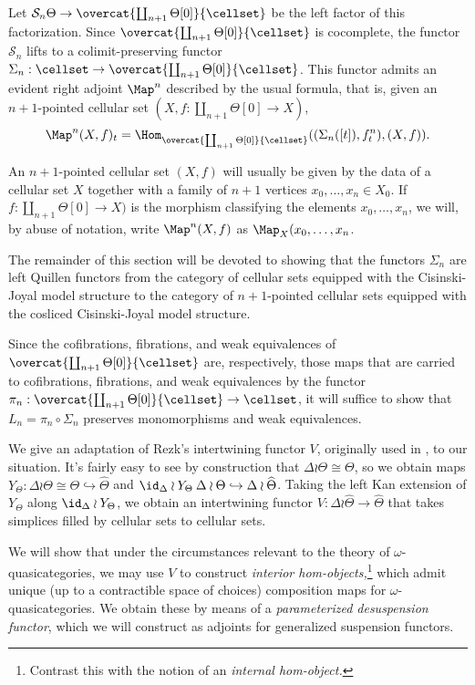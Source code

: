 Let \(\mathcal{S}_n\Theta\to \overcat{\coprod_{n+1}\Theta[0]}{\cellset}\) be the left factor of this factorization.  Since \(\overcat{\coprod_{n+1}\Theta[0]}{\cellset}\) is cocomplete, the functor \(\mathcal{S}_n\) lifts to a colimit-preserving functor \(\Sigma_n:\cellset \to \overcat{\coprod_{n+1}\Theta[0]}{\cellset}\).  This functor admits an evident right adjoint \(\Map^n\) described by the usual formula, that is, given an \(n+1\)-pointed cellular set \((X,f:\coprod_{n+1} \Theta[0]\to X)\),
\[\Map^n(X,f)_t=\Hom_{\overcat{\coprod_{n+1}\Theta[0]}{\cellset}}((\Sigma_n([t]),f^n_t),(X,f)).\]

\begin{rem} An \(n+1\)-pointed cellular set \((X,f)\) will usually be given by the data of a cellular set \(X\) together with a family of \(n+1\) vertices \(x_0,\dots,x_n\in X_0\).  If \(f:\coprod_{n+1} \Theta[0]\to X)\) is the morphism classifying the elements \(x_0,\dots,x_n\), we will, by abuse of notation, write \(\Map^n(X,f)\) as \(\Map_X(x_0,\dots, x_n\).   
\end{rem}

The remainder of this section will be devoted to showing that the functors \(\Sigma_n\) are left Quillen functors from the category of cellular sets equipped with the Cisinski-Joyal model structure to the category of \(n+1\)-pointed cellular sets equipped with the cosliced Cisinski-Joyal model structure.

Since the cofibrations, fibrations, and weak equivalences of \(\overcat{\coprod_{n+1}\Theta[0]}{\cellset}\) are, respectively, those maps that are carried to cofibrations, fibrations, and weak equivalences by the functor \(\pi_n:\overcat{\coprod_{n+1}\Theta[0]}{\cellset}\to \cellset\), it will suffice to show that \(L_n=\pi_n\circ \Sigma_n\) preserves monomorphisms and weak equivalences.  

We give an adaptation of Rezk's intertwining functor \(V\), originally used in \cite{rezk-theta-n-spaces}, to our situation.  It's fairly easy to see by construction that \(\Delta\wr \Theta\cong\Theta\), so we obtain maps \(Y_\Theta:\Delta\wr \Theta\cong \Theta \hookrightarrow\widehat{\Theta}\) and \(\id_\Delta \wr Y_\Theta\: \Delta\wr \Theta \hookrightarrow \Delta \wr \widehat{\Theta}\).  Taking the left Kan extension of \(Y_\Theta\) along \(\id_\Delta \wr Y_\Theta\), we obtain an intertwining functor \(V: \Delta \wr \widehat{\Theta}\to \widehat{\Theta}\) that takes simplices filled by cellular sets to cellular sets.

We will show that under the circumstances relevant to the theory of \(\omega\)-quasicategories, we may use \(V\) to construct \emph{interior hom-objects,}\footnote{Contrast this with the notion of an \emph{internal hom-object.}} which admit unique (up to a contractible space of choices) composition maps for \(\omega\)-quasicategories.  We obtain these by means of a \emph{parameterized desuspension functor}, which we will construct as adjoints for generalized suspension functors.  


